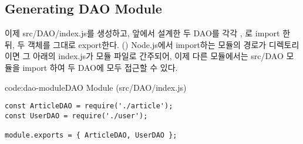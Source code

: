 \subsection*{Generating DAO Module}

이제 src/DAO/index.js를 생성하고, 앞에서 설계한 두 DAO를 각각 , 로 import 한 뒤, 두 객체를 그대로 export한다. () Node.js에서 import하는 모듈의 경로가 디렉토리이면 그 아래의 index.js가 모듈 파일로 간주되어, 이제 다른 모듈에서는 src/DAO 모듈을 import 하여 두 DAO에 모두 접근할 수 있다.

\begin{code}{code:dao-module}{DAO Module (src/DAO/index.js)}
\begin{verbatim}
const ArticleDAO = require('./article');
const UserDAO = require('./user');

module.exports = { ArticleDAO, UserDAO };
\end{verbatim}
\end{code}
